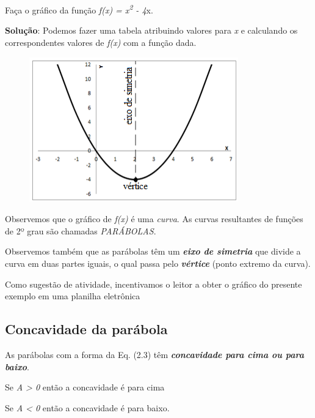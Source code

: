 \begin{texemplo}
Faça o gráfico da função  \textit{f(x) = x\textsuperscript{2} - 4}x.

\textbf{Solução}: Podemos fazer uma tabela atribuindo valores para \textit{x} e calculando os correspondentes valores de \textit{f(x)} com a função dada.

\begin{figure}[H]
	\begin{Center}
		\includegraphics[width=3.56in,height=2.46in]{capitulos/funcao_do_segundo_grau/media/image2.png}
	\end{Center}
\end{figure}

Observemos que o gráfico de \textit{f(x)} é uma \textit{curva}. As curvas resultantes de funções de 2º grau são chamadas \textit{PARÁBOLAS}. 

Observemos também que as parábolas têm um \textbf{\textit{eixo de simetria}} que divide a curva em duas partes iguais, o qual passa pelo \textbf{\textit{vértice}} (ponto extremo da curva). 

Como sugestão de atividade, incentivamos o leitor a obter o gráfico do presente exemplo em uma planilha eletrônica \qedsymbol{}
\end{texemplo}

\subsection{Concavidade da parábola}

As parábolas com a forma da Eq. (2.3) têm \textbf{\textit{concavidade para cima ou para baixo}}.

\begin{caixa}
Se \textit{A > 0}  então a concavidade é para cima

Se \textit{A < 0}  então a concavidade é para baixo.
\end{caixa}

